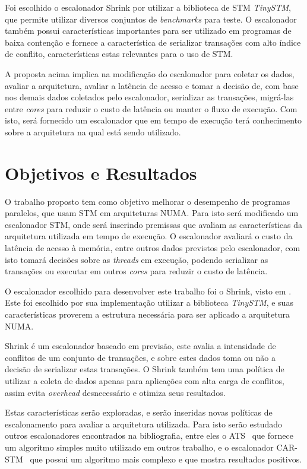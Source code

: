 \documentclass[diss-proposta,nocipinfo]{texufpel}
\begin{document}
Foi escolhido o escalonador Shrink por utilizar a biblioteca de STM \emph{TinySTM}, que permite utilizar diversos conjuntos de \emph{benchmarks} para teste. O escalonador também possui características importantes para ser utilizado em programas de baixa contenção e fornece a característica de serializar transações com alto índice de conflito, características estas relevantes para o uso de STM.

A proposta acima implica na modificação do escalonador para coletar os dados, avaliar a arquitetura, avaliar a latência de acesso e tomar a decisão de, com base nos demais dados coletados pelo escalonador, serializar as transações, migrá-las entre \emph{cores} para reduzir o custo de latência ou manter o fluxo de execução. Com isto, será fornecido um escalonador que em tempo de execução terá conhecimento sobre a arquitetura na qual está sendo utilizado.

\chapter{Objetivos e Resultados}

O trabalho proposto tem como objetivo melhorar o desempenho de programas paralelos, que usam STM em arquiteturas NUMA. Para isto será modificado um escalonador STM, onde será inserindo premissas que avaliam as características da arquitetura utilizada em tempo de execução. O escalonador avaliará o custo da latência de acesso à memória, entre outros dados previstos pelo escalonador, com isto tomará decisões sobre as \emph{threads} em execução, podendo serializar as transações ou executar em outros \emph{cores} para reduzir o custo de latência.

O escalonador escolhido para desenvolver este trabalho foi o Shrink, visto em \cite{dragojevic09}. Este foi escolhido por sua implementação utilizar a biblioteca \emph{TinySTM}, e suas características proverem a estrutura necessária para ser aplicado a arquitetura NUMA.

Shrink é um escalonador baseado em previsão, este avalia a intensidade de conflitos de um conjunto de transações, e sobre estes dados toma ou não a decisão de serializar estas transações. O Shrink também tem uma política de utilizar a coleta de dados apenas para aplicações com alta carga de conflitos, assim evita \emph{overhead} desnecessário e otimiza seus resultados.

Estas características serão exploradas, e serão inseridas novas políticas de escalonamento para avaliar a arquitetura utilizada. Para isto serão estudado outros escalonadores encontrados na bibliografia, entre eles o ATS~\cite{yoo08} que fornece um algoritmo simples muito utilizado em outros trabalho, e o escalonador CAR-STM~\cite{dolev08} que possui um algoritmo mais complexo e que mostra resultados positivos.
\end{document}
